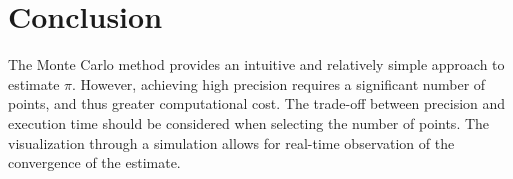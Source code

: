 \documentclass{article}
\begin{document}
\section{Conclusion}
The Monte Carlo method provides an intuitive and relatively simple approach to estimate $\pi$. However, achieving high precision requires a significant number of points, and thus greater computational cost. The trade-off between precision and execution time should be considered when selecting the number of points. The visualization through a simulation allows for real-time observation of the convergence of the estimate.
\end{document}
